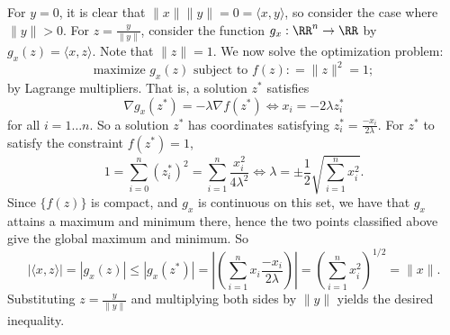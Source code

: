 \documentclass{homework}
\begin{document}
\begin{solution}
  For $y = 0$, it is clear that $\|x\|\|y\| = 0 = \langle x,y\rangle$, so consider the case where $\|y\| > 0$. For $z = \frac y{\|y\|}$,  consider the function $g_x:\RR^n \to \RR$ by $g_x(z) = \langle x,z\rangle$. Note that $\|z\| = 1$.  We now solve the optimization problem: 
  $$
    \text{maximize }g_x(z)\text{ subject to }f(z): = \|z\|^2 = 1;
  $$ 
  by Lagrange multipliers.  That is, a solution $z^*$ satisfies
  $$
    \nabla g_x(z^*) = -\lambda \nabla f(z^*)\iff x_i = -2 \lambda z_i^*
  $$
  for all $i = 1\dots n$. So a solution $z^*$ has coordinates satisfying $z^*_i = \frac {-x_i}{2\lambda}$. For $z^*$ to satisfy the constraint $f(z^*) = 1$, 
  $$
    1 = \sum_{i=0}^n (z_i^*)^2 = \sum_{i=1}^n \frac {x_i^2}{4\lambda ^2} \iff \lambda = \pm\frac 12 \sqrt{\sum_{i=1}^n x_i^2}.
  $$
  Since $\{f(z)\}$ is compact, and $g_x$ is continuous on this set, we have that $g_x$ attains a maximum and minimum there, hence the two points classified above give the global maximum and minimum. So
  $$
    |\langle x,z\rangle| = |g_x(z)| \le |g_x(z^*)| = \left| \left(\sum_{i=1}^n x_i \frac{-x_i}{2\lambda } \right) \right|  = \left( \sum_{i=1}^n x_i^2 \right)^{1/2} = \|x \|.
  $$
  Substituting $z = \frac y{\|y\|}$ and multiplying both sides by $\|y\|$ yields the desired inequality.
  
\end{solution}
\end{document}
